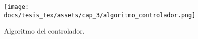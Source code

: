 
\begin{figure}[H]
    \centering
    \texttt{[image: docs/tesis\_tex/assets/cap\_3/algoritmo\_controlador.png]}
    \caption{Algoritmo del controlador.}
    \label{fig:algoritmo_controlador}
\end{figure}